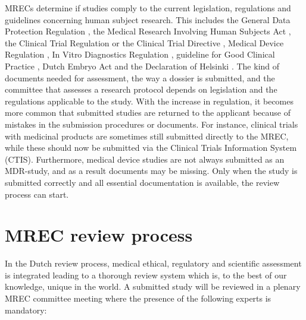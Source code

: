 \documentclass[authordate, meta]{jote-new-article}
\begin{document}
MRECs determine if studies comply to the current legislation, regulations and guidelines concerning human subject research. This includes the General Data Protection Regulation \parencites[GDPR;][]{TheEuropeanParliament2016}, the Medical Research Involving Human Subjects Act \parencites[WMO;][]{NederlandseOverheid2022}, the Clinical Trial Regulation \parencites[CTR;][]{TheEuropeanParliament2014} or the Clinical Trial Directive   \parencites[CTD, till 31\textsuperscript{st} of January 2022;][]{TheEuropeanParliament2001}, Medical Device Regulation \parencites[MDR;][]{TheEuropeanParliament2021}, In Vitro Diagnostics Regulation \parencites[IVDR;][]{TheEuropeanParliament2017}, guideline for Good Clinical Practice \parencites{EuropeanMedicinesAgency2016}, Dutch Embryo Act \parencites{NederlandseOverheid2021} and the Declaration of Helsinki \parencites{TheWorldMedicalAssociation2013}. The kind of documents needed for assessment, the way a dossier is submitted, and the committee that assesses a research protocol depends on legislation and the regulations applicable to the study. With the increase in regulation, it becomes more common that submitted studies are returned to the applicant because of mistakes in the submission procedures or documents. For instance, clinical trials with medicinal products are sometimes still submitted directly to the MREC, while these should now be submitted via the Clinical Trials Information System (CTIS). Furthermore, medical device studies are not always submitted as an MDR-study, and as a result documents may be missing. Only when the study is submitted correctly and all essential documentation is available, the review process can start.







\section{MREC review process}



In the Dutch review process, medical ethical, regulatory and scientific assessment is integrated leading to a thorough review system which is, to the best of our knowledge, unique in the world. A submitted study will be reviewed in a plenary MREC committee meeting where the presence of the following experts is mandatory:
\end{document}
